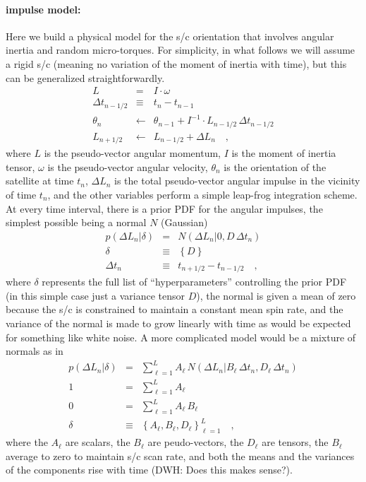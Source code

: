 \documentclass[12pt]{article}
\begin{document}
\paragraph{impulse model:}
Here we build a physical model for the s/c orientation that involves
angular inertia and random micro-torques.  For simplicity, in what
follows we will assume a rigid s/c (meaning no variation of the moment
of inertia with time), but this can be generalized straightforwardly.
\begin{eqnarray}\displaystyle
L &=& I \cdot \omega
\\
\Delta t_{n-1/2} &\equiv& t_n - t_{n-1}
\\
\theta_n &\leftarrow& \theta_{n-1} + I^{-1}\cdot L_{n-1/2}\,\Delta t_{n-1/2}
\\
L_{n+1/2} &\leftarrow& L_{n-1/2} + \Delta L_n
\quad ,
\end{eqnarray}
where $L$ is the pseudo-vector angular momentum, $I$ is the moment of
inertia tensor, $\omega$ is the pseudo-vector angular velocity,
$\theta_n$ is the orientation of the satellite at time $t_n$, $\Delta
L_n$ is the total pseudo-vector angular impulse in the vicinity of
time $t_n$, and the other variables perform a simple leap-frog
integration scheme.  At every time interval, there is a prior PDF for
the angular impulses, the simplest possible being a normal $N$
(Gaussian)
\begin{eqnarray}\displaystyle
p(\Delta L_n|\delta) &=& N(\Delta L_n|0,D\,\Delta t_n)
\\
\delta &\equiv& \left\{D\right\}
\\
\Delta t_n &\equiv& t_{n+1/2} - t_{n-1/2}
\quad ,
\end{eqnarray}
where $\delta$ represents the full list of ``hyperparameters''
controlling the prior PDF (in this simple case just a variance tensor
$D$), the normal is given a mean of zero because the s/c is
constrained to maintain a constant mean spin rate, and the variance of
the normal is made to grow linearly with time as would be expected for
something like white noise.  A more complicated model would be a
mixture of normals as in
\begin{eqnarray}\displaystyle
p(\Delta L_n|\delta) &=& \sum_{\ell=1}^L A_\ell\,N(\Delta L_n|B_\ell\,\Delta t_n, D_\ell\,\Delta t_n)
\\
1 &=& \sum_{\ell=1}^L A_\ell
\\
0 &=& \sum_{\ell=1}^L A_\ell\,B_\ell
\\
\delta &\equiv& \left\{A_\ell, B_\ell, D_\ell\right\}_{\ell=1}^L
\quad ,
\end{eqnarray}
where the $A_\ell$ are scalars, the $B_\ell$ are peudo-vectors, the
$D_\ell$ are tensors, the $B_\ell$ average to zero to maintain s/c
scan rate, and both the means and the variances of the components rise
with time (DWH: Does this makes sense?).
\end{document}
